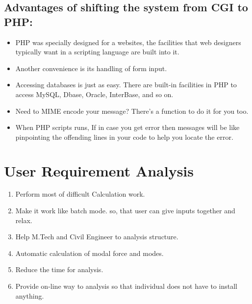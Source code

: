 \subsection{Advantages of shifting the system from CGI to PHP:}
\begin{itemize}
\item PHP was specially designed for a websites, the facilities that web designers typically want in a scripting language are built into it.
\item Another convenience is its handling of form input.
\item Accessing databases is just as easy. There are built-in facilities in PHP to access MySQL, Dbase, Oracle, InterBase, and so on.
\item Need to MIME encode your message? There's a function to do it for you too.
\item When PHP scripts runs, If in case  you get error then messages will be like pinpointing the offending lines in your code to help you locate the error.
\end{itemize} 
\section{User Requirement Analysis}
\begin{enumerate}
\item Perform most of difficult Calculation work.
\item Make it work like batch mode. so, that user can give inputs 
together and relax.
\item Help M.Tech and Civil Engineer to analysis structure.
\item Automatic calculation of modal force and modes.
\item Reduce the time for analysis.
\item Provide on-line way to analysis so that individual does not have to 
install anything.
\end{enumerate}




